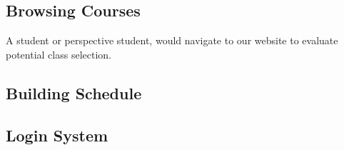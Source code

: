 




\subsection*{Browsing Courses}
%
A student or perspective student, would navigate to our website to evaluate potential class selection.
%
%
\subsection*{Building Schedule}
%
\subsection*{Login System}
%

